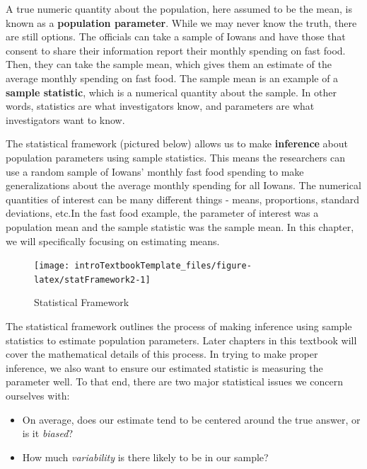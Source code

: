 \documentclass[
]{book}
\providecommand{\tightlist}{%
  \setlength{\itemsep}{0pt}\setlength{\parskip}{0pt}}
\theoremstyle{definition}
\theoremstyle{definition}
\theoremstyle{definition}
\theoremstyle{remark}
\begin{document}
A true numeric quantity about the population, here assumed to be the mean, is known as a \textbf{population parameter}. While we may never know the truth, there are still options. The officials can take a sample of Iowans and have those that consent to share their information report their monthly spending on fast food. Then, they can take the sample mean, which gives them an estimate of the average monthly spending on fast food. The sample mean is an example of a \textbf{sample statistic}, which is a numerical quantity about the sample. In other words, statistics are what investigators know, and parameters are what investigators want to know.

The statistical framework (pictured below) allows us to make \textbf{inference} about population parameters using sample statistics. This means the researchers can use a random sample of Iowans' monthly fast food spending to make generalizations about the average monthly spending for all Iowans. The numerical quantities of interest can be many different things - means, proportions, standard deviations, etc.In the fast food example, the parameter of interest was a population mean and the sample statistic was the sample mean. In this chapter, we will specifically focusing on estimating means.

\begin{figure}

{\centering \texttt{[image: introTextbookTemplate\_files/figure-latex/statFramework2-1]} 

}

\caption{Statistical Framework}\label{fig:statFramework2}
\end{figure}

The statistical framework outlines the process of making inference using sample statistics to estimate population parameters. Later chapters in this textbook will cover the mathematical details of this process. In trying to make proper inference, we also want to ensure our estimated statistic is measuring the parameter well. To that end, there are two major statistical issues we concern ourselves with:

\begin{itemize}
\tightlist
\item
  On average, does our estimate tend to be centered around the true answer, or is it \emph{biased}?\\
\item
  How much \emph{variability} is there likely to be in our sample?
\end{itemize}
\end{document}
